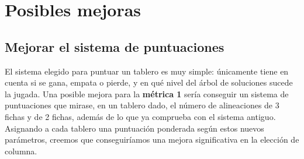 \documentclass[11pt]{article}
\begin{document}
\section{Posibles mejoras}
\label{sec-3}

\subsection{Mejorar el sistema de puntuaciones}
\label{sec-3-1}

El sistema elegido para puntuar un tablero es muy simple: únicamente tiene en cuenta si se gana, empata o pierde, y en qué nivel del árbol de soluciones sucede la jugada. Una posible mejora para la \textbf{\textbf{métrica 1}} sería conseguir un sistema de puntuaciones que mirase, en un tablero dado, el número de alineaciones de 3 fichas y de 2 fichas, además de lo que ya comprueba con el sistema antiguo. Asignando a cada tablero una puntuación ponderada según estos nuevos parámetros, creemos que conseguiríamos una mejora significativa en la elección de columna.
\end{document}

